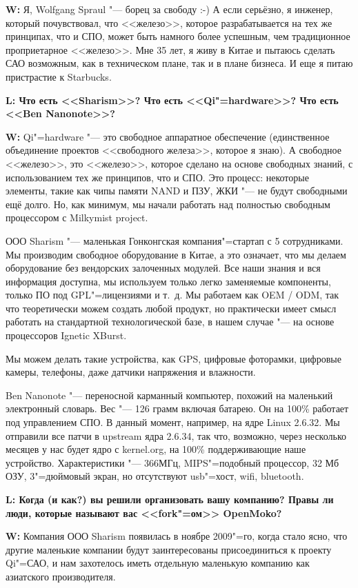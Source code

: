 \documentclass[10pt, a5paper]{article}
\begin{document}
{\noindent \bf W:} Я, Wolfgang Spraul "--- борец за свободу :-) А если серьёзно, я инженер, который почувствовал, что <<железо>>, которое разрабатывается на тех же принципах, что и СПО, может быть намного более успешным, чем традиционное проприетарное <<железо>>. Мне 35 лет, я живу в Китае и пытаюсь сделать САО возможным, как в техническом плане, так и в плане бизнеса. И еще я питаю пристрастие к Starbucks.

{\noindent \bf L: Что есть <<Sharism>>? Что есть <<Qi"=hardware>>? Что есть <<Ben Nanonote>>?}

{\noindent \bf W:} Qi"=hardware "--- это свободное аппаратное обеспечение (единственное объединение проектов <<свободного железа>>, которое я знаю). А свободное <<железо>>, это <<железо>>, которое сделано на основе свободных знаний, с использованием тех же принципов, что и СПО. Это процесс: некоторые элементы, такие как чипы памяти NAND и ПЗУ, ЖКИ "--- не будут свободными ещё долго. Но, как минимум, мы начали работать над полностью свободным процессором с Milkymist project.

ООО Sharism "--- маленькая Гонконгская компания"=стартап с 5 сотрудниками. Мы производим свободное оборудование в Китае, а это означает, что мы делаем оборудование без вендорских залоченных модулей. Все наши знания и вся информация доступна, мы используем только легко заменяемые компоненты, только ПО под GPL"=лицензиями и т.~д. Мы работаем как OEM / ODM, так что теоретически можем создать любой продукт, но практически имеет смысл работать на стандартной технологической базе, в нашем случае "--- на основе процессоров Ignetic XBurst.

Мы можем делать такие устройства, как GPS, цифровые фоторамки, цифровые камеры, телефоны, даже датчики напряжения и влажности.

Ben Nanonote "--- переносной карманный компьютер, похожий на маленький электронный словарь. Вес "--- 126 грамм включая батарею. Он на 100\% работает под управлением СПО. В данный момент, например, на ядре Linux 2.6.32. Мы отправили все патчи в upstream ядра 2.6.34, так что, возможно, через несколько месяцев у нас будет ядро с kernel.org, на 100\% поддерживающие наше устройство. Характеристики "--- 366МГц, MIPS"=подобный процессор, 32 Мб ОЗУ, 3"=дюймовый экран, но отсутствуют usb"=хост, wifi, bluetooth.

{\noindent \bf L: Когда (и как?) вы решили организовать вашу компанию? Правы ли люди, которые называют вас <<fork"=ом>> OpenMoko?}

{\noindent \bf W:} Компания ООО Sharism появилась в ноябре 2009"=го, когда стало ясно, что другие маленькие компании будут заинтересованы присоединиться к проекту Qi"=САО, и нам захотелось иметь отдельную маленькую компанию как азиатского производителя.
\end{document}
